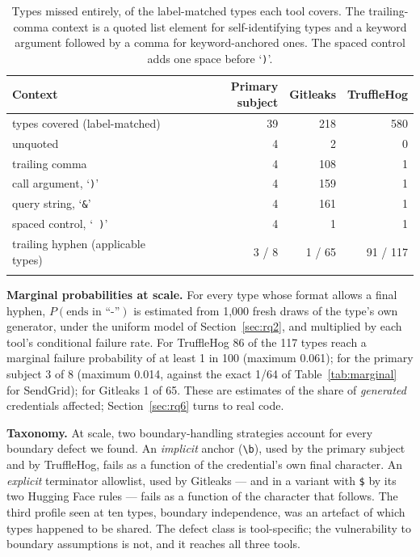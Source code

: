 \documentclass[pdflatex,sn-basic]{sn-jnl}
\begin{document}
\begin{table}[t]
\centering
\caption{Types missed entirely, of the label-matched types each tool covers. The trailing-comma context is a quoted list element for self-identifying types and a keyword argument followed by a comma for keyword-anchored ones. The spaced control adds one space before `\texttt{)}'.}
\label{tab:battery774}
\small
\setlength{\tabcolsep}{5pt}
\begin{tabular}{@{}lrrr@{}}
\toprule
Context & Primary subject & Gitleaks & TruffleHog \\
\midrule
types covered (label-matched) & 39 & 218 & 580 \\
\midrule
unquoted & 4 & 2 & 0 \\
trailing comma & 4 & 108 & 1 \\
call argument, `\texttt{)}' & 4 & 159 & 1 \\
query string, `\texttt{\&}' & 4 & 161 & 1 \\
spaced control, `\texttt{\ )}' & 4 & 1 & 1 \\
\midrule
trailing hyphen (applicable types) & 3 / 8 & 1 / 65 & 91 / 117 \\
\botrule
\end{tabular}
\end{table}

\textbf{Marginal probabilities at scale.} For every type whose format allows a final hyphen, $P(\text{ends in ``-''})$ is estimated from 1{,}000 fresh draws of the type's own generator, under the uniform model of Section~\ref{sec:rq2}, and multiplied by each tool's conditional failure rate. For TruffleHog 86 of the 117 types reach a marginal failure probability of at least 1 in 100 (maximum 0.061); for the primary subject 3 of 8 (maximum 0.014, against the exact 1/64 of Table~\ref{tab:marginal} for SendGrid); for Gitleaks 1 of 65. These are estimates of the share of \emph{generated} credentials affected; Section~\ref{sec:rq6} turns to real code.

\textbf{Taxonomy.} At scale, two boundary-handling strategies account for every boundary defect we found. An \emph{implicit} anchor (\verb|\b|), used by the primary subject and by TruffleHog, fails as a function of the credential's own final character. An \emph{explicit} terminator allowlist, used by Gitleaks --- and in a variant with \verb|$| by its two Hugging Face rules --- fails as a function of the character that follows. The third profile seen at ten types, boundary independence, was an artefact of which types happened to be shared. The defect class is tool-specific; the vulnerability to boundary assumptions is not, and it reaches all three tools.
\end{document}
